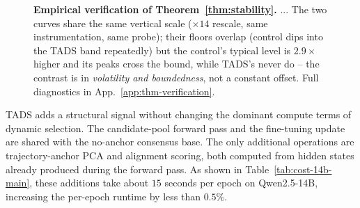 \begin{figure}[t]
{%
}
\caption{\textbf{Empirical verification of
Theorem~\ref{thm:stability}.} ...
The two curves share the same vertical scale ($\times 14$ rescale,
same instrumentation, same probe); their floors overlap (control
dips into the \textsc{TADS} band repeatedly) but the control's
typical level is $2.9\times$ higher and its peaks cross the bound,
while \textsc{TADS}'s never do -- the contrast is in
\emph{volatility and boundedness}, not a constant offset. Full
diagnostics in App.~\ref{app:thm-verification}.}
\label{fig:thm-main}
\end{figure}

\textsc{TADS} adds a structural signal without changing the dominant
compute terms of dynamic selection. The candidate-pool forward pass
and the fine-tuning update are shared with the no-anchor consensus
base. The only additional operations are trajectory-anchor PCA and
alignment scoring, both computed from hidden states already produced
during the forward pass. As shown in Table~\ref{tab:cost-14b-main},
these additions take about $15$ seconds per epoch on Qwen2.5-14B,
increasing the per-epoch runtime by less than $0.5\%$.

